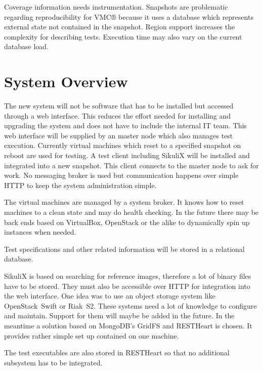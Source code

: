 \documentclass[a4paper,twocolumn]{article}
\newcommand{\VMC}[0]{VMC®}
\begin{document}
Coverage information needs instrumentation.
Snapshots are problematic regarding reproducibility for \VMC{} because it uses a database which represents external state not contained in the snapshot.
Region support increases the complexity for describing tests.
Execution time may also vary on the current database load.

\section{System Overview}
The new system will not be software that has to be installed but accessed through a web interface.
This reduces the effort needed for installing and upgrading the system and does not have to include the internal IT team.
This web interface will be supplied by an master node which also manages test execution.
Currently virtual machines which reset to a specified snapshot on reboot are used for testing.
A test client including SikuliX will be installed and integrated into a new snapshot.
This client connects to the master node to ask for work.
No messaging broker is used but communication happens over simple HTTP to keep the system administration simple.

The virtual machines are managed by a system broker.
It knows how to reset machines to a clean state and may do health checking.
In the future there may be back ends based on VirtualBox\cite{VirtualBox}, OpenStack\cite{OpenStack} or the alike to dynamically spin up instances when needed.

Test specifications and other related information will be stored in a relational database.

SikuliX is based on searching for reference images, therefore a lot of binary files have to be stored.
They must also be accessible over HTTP for integration into the web interface.
One idea was to use an object storage system like OpenStack~Swift\cite{OpenStackSwift} or Riak~S2\cite{RiakS2}.
These systems need a lot of knowledge to configure and maintain.
Support for them will maybe be added in the future.
In the meantime a solution based on MongoDB's GridFS\cite{GridFS} and RESTHeart\cite{RESTHeart} is chosen.
It provides rather simple set up contained on one machine.

The test executables are also stored in RESTHeart so that no additional subsystem has to be integrated.

\end{document}
